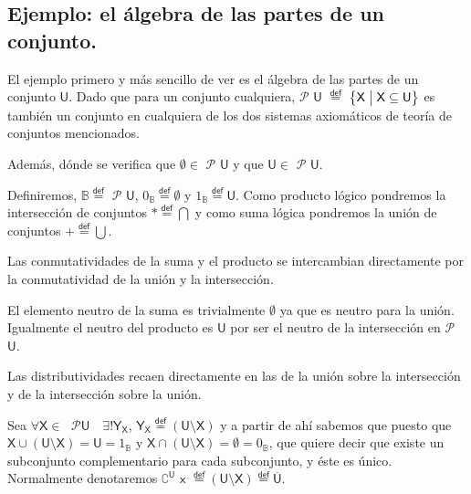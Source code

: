 \documentclass[final,12pt,a4paper,twoside,fleqn]{extbook}
\newcommand{\mathdef}{\ensuremath{\stackrel{\mathsf{def}}{{}={}}}}
\newcommand {\setCompr}[2]{
	\ensuremath{
		\left\lbrace{ 
			#1 {\;\big{\vert}\;} #2
        }\right\rbrace
    }
}
\newcommand{\setB}{\ensuremath{\mathbb{B}}}
\theoremstyle{definition}
\theoremstyle{remark}
\begin{document}
\subsection{Ejemplo: el álgebra de las partes de un conjunto.}



	El ejemplo primero y más sencillo de ver es el álgebra de las partes de
un conjunto $\mathsf{U}$. Dado que para un conjunto cualquiera,
\large {$\mathscr{P}$} \normalsize $\mathsf{U}$ $\mathdef$ $\setCompr{
\mathsf{ X } } { \mathsf{X} \subseteq \mathsf{ U } }$ es también un conjunto
en cualquiera de los dos sistemas axiomáticos de teoría de conjuntos
mencionados.



	Además, dónde se verifica que $\emptyset \in$ \large $\mathscr{P}$
\normalsize $\mathsf{U}$ y que  $\mathsf{U} \in $ \large $\mathscr{P}$
\normalsize $\mathsf{U}$.



	Definiremos, $\setB \mathdef $ \large{$\mathscr{P}$} \normalsize
$\mathsf{U}$, \normalsize $0_{\setB} \mathdef \emptyset$ y $1_{\setB}
\mathdef \mathsf{U}$. Como producto lógico pondremos la intersección de
conjuntos $* \mathdef \bigcap$ y como suma lógica pondremos la unión de
conjuntos $+ \mathdef \bigcup$.



	Las conmutatividades de la suma y el producto se intercambian
directamente por la conmutatividad de la unión y la intersección.



	El elemento neutro de la suma es trivialmente $\emptyset$ ya que es
neutro para la unión. Igualmente el neutro del producto es $\mathsf{U}$ por
ser el neutro de la intersección en \large $\mathscr{P}$ \normalsize
$\mathsf{U}$.



	Las distributividades recaen directamente en las de la unión sobre la
intersección y de la intersección sobre la unión.



	Sea $\forall \mathsf{X} \in \;$ \large
$\mathscr{P}$\normalsize$\mathsf{U}$$\quad \exists \mathsf{!}
{\mathsf{Y}}_{\mathsf{X}}$,  ${\mathsf{Y}}_{\mathsf{X}} \mathdef
\left(\mathsf{U} \setminus \mathsf{X}\right)$ y a partir de ahí sabemos que
puesto que $\mathsf{X} \cup \left(\mathsf{U}\setminus\mathsf{X}\right) =
\mathsf{U} = 1_{\setB}$ y $\mathsf{X} \cap \left( \mathsf{U} \setminus
\mathsf{X} \right) = \emptyset = 0_{\setB}$, que quiere decir que existe un
subconjunto complementario para cada subconjunto, y éste es único. 
Normalmente denotaremos ${ {\complement}^{\mathsf{U} } }$ \Large $\mathsf{x}$
\normalsize $ \mathdef \left({\mathsf{U}\setminus\mathsf{X}}\right) \mathdef
{\overline{\mathsf{U}}}$.
\end{document}
